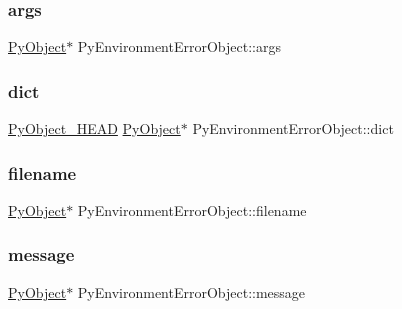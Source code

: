 \subsubsection{\texorpdfstring{args}{args}}
{\footnotesize\ttfamily \mbox{\hyperlink{_python27_2object_8h_aadc84ac7aed2cfa6f20c25f62bf3dac7}{Py\+Object}}$\ast$ Py\+Environment\+Error\+Object\+::args}

\mbox{\label{struct_py_environment_error_object_a9b6363c4c36c3fe124dd1173d6bea6dd}} 
\subsubsection{\texorpdfstring{dict}{dict}}
{\footnotesize\ttfamily \mbox{\hyperlink{_python27_2object_8h_a0bf35c1f3ea13f925de94d8593db3b7e}{Py\+Object\+\_\+\+H\+E\+AD}} \mbox{\hyperlink{_python27_2object_8h_aadc84ac7aed2cfa6f20c25f62bf3dac7}{Py\+Object}}$\ast$ Py\+Environment\+Error\+Object\+::dict}

\mbox{\label{struct_py_environment_error_object_ae996e0c9909b5c16d077ea57d93182a0}} 
\subsubsection{\texorpdfstring{filename}{filename}}
{\footnotesize\ttfamily \mbox{\hyperlink{_python27_2object_8h_aadc84ac7aed2cfa6f20c25f62bf3dac7}{Py\+Object}}$\ast$ Py\+Environment\+Error\+Object\+::filename}

\mbox{\label{struct_py_environment_error_object_a0ca308cc7d2f5d01c612e9bf60860279}} 
\subsubsection{\texorpdfstring{message}{message}}
{\footnotesize\ttfamily \mbox{\hyperlink{_python27_2object_8h_aadc84ac7aed2cfa6f20c25f62bf3dac7}{Py\+Object}}$\ast$ Py\+Environment\+Error\+Object\+::message}

